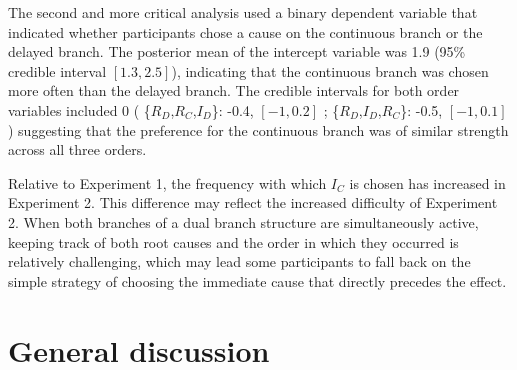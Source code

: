 \documentclass[10pt,letterpaper]{article}
\newcommand{\ev}[2]{$#1_#2$}
\begin{document}
The second and more critical analysis used a binary dependent variable that indicated whether participants chose a cause on the continuous branch or the delayed branch.  The posterior mean of the intercept variable was 1.9 (95\% credible interval $[1.3, 2.5]$), indicating that the continuous branch was chosen more often than the delayed branch.  The credible intervals for both order variables included 0 ( \{\ev{R}{D},\ev{R}{C},\ev{I}{D}\}: -0.4, $[-1,0.2]$ ; \{\ev{R}{D},\ev{I}{D},\ev{R}{C}\}: -0.5, $[-1,0.1]$) suggesting that the preference for the continuous branch was of similar strength across all three orders. 

Relative to Experiment 1, the frequency with which \ev{I}{C} is chosen has increased in Experiment 2. This difference may reflect the increased difficulty of Experiment 2. When both branches of a dual branch structure are simultaneously active, keeping track of both root causes and the order in which they occurred is relatively challenging, which may lead some participants to fall back on the simple strategy of choosing the immediate cause that directly precedes the effect.


\section{General discussion}
\end{document}
